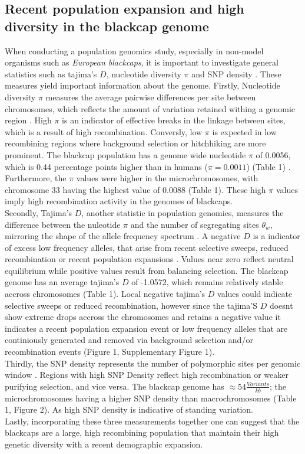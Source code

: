 \documentclass[12pt,a4paper]{article}
\begin{document}
\subsection{Recent population expansion and high diversity in the blackcap genome}
When conducting a population genomics study, especially in non-model organisms such as \textit{European blackcaps},
it is important to investigate general statistics such as tajima's $D$, nucleotide diversity
$\pi$ and SNP density \parencite{Tajima-1989, nei-and-li-1979}. These measures yield important
information about the genome. Firstly, Nucleotide diversity $\pi$ measures the average pairwise differences per site
between chromosomes, which reflects the amount of variation retained withing a genomic region
\parencite{nielsen2013introduction, nei-and-li-1979}. High $\pi$ is an indicator of effective
breaks in the linkage between sites, which is a result of high recombination. Conversly, low $\pi$
is expected in low recombining regions where background selection or hitchhiking are more prominent.
The blackcap population has a genome wide nucleotide $\pi$ of 0.0056, which is 0.44 percentage points
higher than in humans ($\pi = 0.0011$) (Table 1) \parencite{Li-and-Sadler-1991}. Furthermore, the
$\pi$ values were higher in the microchromosomes, with chromosome 33 having the highest value of
0.0088 (Table 1). These high $\pi$ values imply high recombination activity in the
genomes of blackcaps. \\
Secondly, Tajima's $D$, another statistic in population genomics, measures the difference between the
nuleotide $\pi$ and the number of segregating sites $\theta_{w}$, mirroring the shape of the allele
frequency spectrum \parencite{nielsen2013introduction, Tajima-1989}. A negative $D$ is a indicator
of excess low frequency alleles, that arise from recent selective sweeps, reduced recombination or
recent population expansions \parencite{nielsen2013introduction, Tajima-1989}. Values near zero
reflect neutral equilibrium while positive values result from balancing selection. The blackcap
genome has an average tajima's $D$ of -1.0572, which remains relatively stable accross chromosomes
(Table 1). Local negative tajima's $D$ values could indicate selective sweeps or reduced
recombination, however since the tajima'S $D$ doesnt show extreme drops accross the chromosomes and
retains a negative value it indicates a recent population expansion event or low frequency alleles
that are continiously generated and removed via background selection and/or recombination events (Figure 1, Supplementary
Figure 1).\\
Thirdly, the SNP density represents the number of polymorphic sites per genomic window
\parencite{nielsen2013introduction}. Regions with high SNP Density reflect high recombination or
weaker purifying selection, and vice versa. The blackcap genome has $\approx 54 \frac{Variants}{kb}$;
the microchromosomes having a higher SNP density than macrochromosomes (Table 1, Figure 2). As high
SNP density is indicative of standing variation. \\
Lastly, incorporating these three measurements together one can suggest that the blackcaps are a
large, high recombining population that maintain their high genetic diversity with a
recent demographic expansion.
\end{document}

